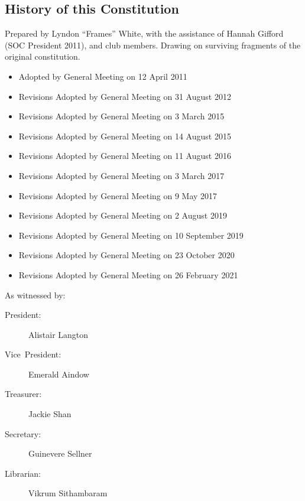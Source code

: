 \documentclass[a4paper]{article}
\begin{document}
\begin{appendices}

    \section{History of this Constitution} \label{sec:app:history}

    \noindent Prepared by Lyndon ``Frames'' White, with the assistance of Hannah Gifford (SOC President 2011), and club members. Drawing on surviving fragments of the original constitution.

    \medskip{}

    \begin{itemize}[label={}]
        \item Adopted by General Meeting on 12 April 2011
        \item Revisions Adopted by General Meeting on 31 August 2012
        \item Revisions Adopted by General Meeting on 3 March 2015
        \item Revisions Adopted by General Meeting on 14 August 2015
        \item Revisions Adopted by General Meeting on 11 August 2016
        \item Revisions Adopted by General Meeting on 3 March 2017
        \item Revisions Adopted by General Meeting on 9 May 2017
        \item Revisions Adopted by General Meeting on 2 August 2019
        \item Revisions Adopted by General Meeting on 10 September 2019
        \item Revisions Adopted by General Meeting on 23 October 2020
        \item Revisions Adopted by General Meeting on 26 February 2021
    \end{itemize}

    \medskip{}

    \noindent As witnessed by:
    \begin{description}
        \item[{President:}] Alistair Langton
        \item[{Vice~President:}] Emerald Aindow
        \item[{Treasurer:}] Jackie Shan
        \item[{Secretary:}] Guinevere Sellner
        \item[{Librarian:}] Vikrum Sithambaram
    \end{description}

\end{appendices}
\end{document}
